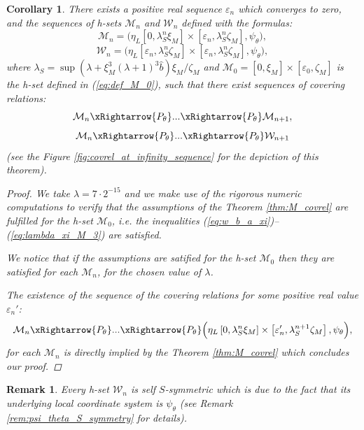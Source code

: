 \documentclass[1p]{article}
\newtheorem{remark}{Remark}
\newtheorem{corollary}{Corollary}
\begin{document}
\begin{corollary}
    \label{col:covrel_M_W}
    There exists a positive real sequence $\varepsilon_n$ which converges to zero, and the sequences of h-sets $\mathcal{M}_n$ and $\mathcal{W}_n$ defined with the formulas:
    \[
        \mathcal{M}_n = \Big( \eta_{L} \left[ 0, \lambda_S^n \xi_M \right] \times \left[ \varepsilon_n, \lambda_S^n \zeta_M \right], \psi_\theta \Big),
    \]
    \[
        \mathcal{W}_n = \Big( \eta_{L} \left[ \varepsilon_n, \lambda_S^n \zeta_M \right] \times \left[ \varepsilon_n, \lambda_S^n \zeta_M \right], \psi_\theta \Big),
    \]
    where $\lambda_S = \sup \left(\lambda + \xi_M^3 (\lambda + 1)^3 \hat{b} \right) \xi_M / \zeta_M$ and $\mathcal{M}_0 = [0, \xi_M] \times [\varepsilon_0, \zeta_M]$ is the h-set defined in (\ref{eq:def_M_0}), such that there exist sequences of covering relations:
    \[
        \mathcal{M}_n \xRightarrow{P_\theta} ... \xRightarrow{P_\theta} \mathcal{M}_{n+1},
    \]
    \[
        \mathcal{M}_n \xRightarrow{P_\theta} ... \xRightarrow{P_\theta} \mathcal{W}_{n+1}
    \]
    (see the Figure \ref{fig:covrel_at_infinity_sequence} for the depiction of this theorem).
    \begin{proof}
        We take $\lambda = 7 \cdot 2^{-15}$ and we make use of the rigorous numeric computations to verify that the assumptions of the Theorem \ref{thm:M_covrel} are fulfilled for the h-set $\mathcal{M}_0$, i.e. the inequalities (\ref{eq:w_b_a_xi})--(\ref{eq:lambda_xi_M_3}) are satisfied.

        We notice that if the assumptions are satified for the h-set $\mathcal{M}_0$ then they are satisfied for each $\mathcal{M}_n$, for the chosen value of $\lambda$. 

        The existence of the sequence of the covering relations for some positive real value $\varepsilon_n'$:
        \[
            \mathcal{M}_n \xRightarrow{P_\theta} ... \xRightarrow{P_\theta} \Big( \eta_{L} \left[ 0, \lambda_S^n \xi_M \right] \times \left[ \varepsilon_n', \lambda_S^{n+1} \zeta_M \right], \psi_\theta \Big),
        \]
        for each $\mathcal{M}_n$ is directly implied by the Theorem \ref{thm:M_covrel} which concludes our proof.
    \end{proof}
\end{corollary}

\begin{remark}
    Every h-set $\mathcal{W}_n$ is self $S$-symmetric which is due to the fact that its underlying local coordinate system is $\psi_\theta$ (see Remark \ref{rem:psi_theta_S_symmetry} for details).
\end{remark}
\end{document}
